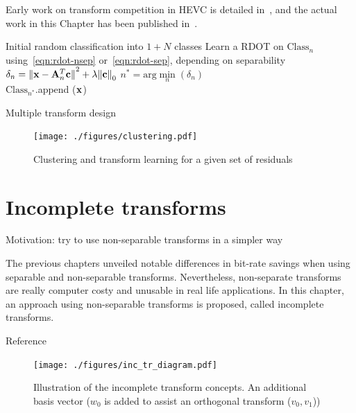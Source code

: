 \documentclass[11pt,a4paper,openright,twoside]{book}
\numberwithin{equation}{section} %
\numberwithin{figure}{section} %
\numberwithin{table}{section} %
\begin{document}
Early work on transform competition in \ac{HEVC} is detailed
in~\cite{arrufat-14-transform-competition-rdot}, and the actual work in this
Chapter has been published in~\cite{arrufat-15-mdtc}.

\begin{algorithm}
	\BlankLine%
	Initial random classification into $1+N$ classes
	\BlankLine%
	{
			{
				Learn a \ac{RDOT} on $\text{Class}_n$
				using~\eqref{eqn:rdot-nsep} or~\eqref{eqn:rdot-sep}, depending
				on separability
			}
			{
				{
					$\delta_n =
					{\Vert \mathbf{x} - \mathbf{A}^T_n\mathbf{c}\Vert}^2 + \lambda{\Vert\mathbf{c}\Vert}_0$
				}
				$\displaystyle n^* = \text{arg}\min\limits_n(\delta_n)$\\
				$\text{Class}_{n^*}$.append ($\mathbf{x}$)
			}
	}
	\caption{Multiple transform design}
	\label{alg:clustering}
\end{algorithm}

\begin{figure}[tp]
	\centering
	\texttt{[image: ./figures/clustering.pdf]}
	\caption{Clustering and transform learning for a given set of residuals}
	\label{fig:clustering}
\end{figure}

\chapter{Incomplete transforms}
\label{cha:incomplete_transforms}

Motivation: try to use non-separable transforms in a simpler way

The previous chapters unveiled notable differences in bit-rate savings when
using separable and non-separable transforms.
Nevertheless, non-separate transforms are really computer costy and unusable
in real life applications.
In this chapter, an approach using non-separable transforms is proposed,
called incomplete transforms.

Reference~\cite{arrufat-15-inc-transforms}

\begin{figure}[tp]
	\centering
	\texttt{[image: ./figures/inc\_tr\_diagram.pdf]}
	\caption{Illustration of the incomplete transform concepts.
	An additional basis vector ($w_0$ is added to assist an orthogonal
	transform ($v_0,v_1$))}
	\label{fig:inc_tr_diagram}
\end{figure}
\end{document}
